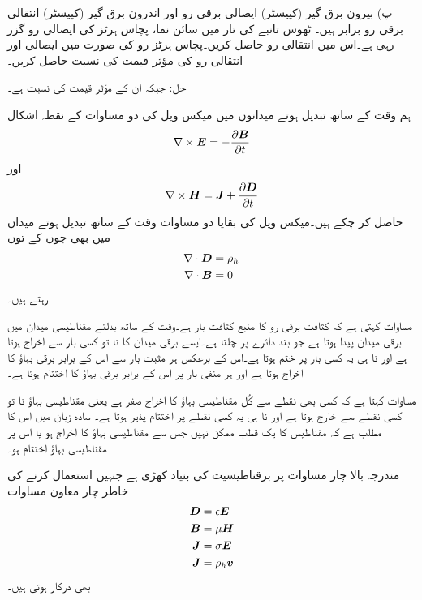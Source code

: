 پ) بیرون برق گیر (کپیسٹر)  ایصالی برقی رو اور اندرون برق گیر (کپیسٹر)  انتقالی برقی رو برابر ہیں۔
ٹھوس تانبے کی تار میں سائن نما، پچاس ہرٹز کی ایصالی رو  گزر رہی ہے۔اس میں انتقالی رو حاصل کریں۔پچاس ہرٹز رو کی صورت میں ایصالی اور انتقالی رو کی  مؤثر قیمت کی نسبت حاصل کریں۔

حل: جبکہ ان کے مؤثر قیمت کی نسبت    ہے۔


ہم وقت کے ساتھ تبدیل ہوتے میدانوں میں میکس ویل کی دو مساوات کے نقطہ اشکال
\begin{align}\label{مساوات-میکس_ویل_تفرقی_الف}
\nabla \times {\ensuremath{{\boldsymbol{E}}}}=-\frac{\partial {\ensuremath{{\boldsymbol{B}}}}}{\partial t}
\end{align}
اور
\begin{align}\label{مساوات-میکس_ویل_تفرقی_ب}
\nabla \times {\ensuremath{{\boldsymbol{H}}}}={{\boldsymbol{J}}}+\frac{\partial {\ensuremath{{\boldsymbol{D}}}}}{\partial t}
\end{align}
 حاصل کر چکے ہیں۔میکس ویل کی بقایا دو مساوات وقت کے ساتھ تبدیل ہوتے میدان میں بھی جوں کے توں
\begin{align}
\nabla \cdot {\ensuremath{{\boldsymbol{D}}}}&=\rho_h \label{مساوات_میکس_ویل_گاوس_قانون_نقطہ}\\
\nabla \cdot {\ensuremath{{\boldsymbol{B}}}}&=0 \label{مساوات_میکس_ویل_مقناطیسی_میدان_دو_قطب}
\end{align}
 رہتے ہیں۔ 

مساوات  کہتی ہے کہ کثافت برقی رو کا منبع کثافت بار  ہے۔وقت کے ساتھ بدلتے مقناطیسی میدان میں برقی میدان  پیدا ہوتا ہے جو بند دائرے پر چلتا ہے۔ایسے برقی میدان کا نا تو کسی بار سے اخراج ہوتا ہے اور نا ہی یہ کسی بار پر ختم ہوتا ہے۔اس کے برعکس ہر مثبت بار سے اس کے برابر برقی بہاؤ کا اخراج ہوتا ہے اور ہر منفی بار پر اس کے برابر برقی بہاؤ کا اختتام ہوتا ہے۔
  

مساوات  کہتا ہے کہ کسی بھی نقطے سے کُل مقناطیسی بہاؤ کا اخراج صفر ہے یعنی مقناطیسی بہاؤ نا تو کسی نقطے سے خارج ہوتا ہے اور نا ہی یہ کسی نقطے پر اختتام پذیر ہوتا ہے۔ سادہ زبان میں اس کا مطلب ہے کہ مقناطیس کا یک قطب ممکن نہیں جس سے مقناطیسی بہاؤ کا اخراج ہو یا اس پر مقناطیسی بہاؤ اختتام ہو۔

مندرجہ بالا چار مساوات پر برقناطیسیت کی بنیاد کھڑی ہے جنہیں استعمال کرنے کی خاطر چار معاون مساوات
\begin{align}
{\ensuremath{{\boldsymbol{D}}}}&=\epsilon {\ensuremath{{\boldsymbol{E}}}} \label{مساوات_میکس_ویل_خالی_خلاء_برقی_مستقل}\\
{{\boldsymbol{B}}}&=\mu {\ensuremath{{\boldsymbol{H}}}} \label{مساوات_میکس_ویل_خالی_خلاء_مقناطیسی_مستقل}\\
{{\boldsymbol{J}}}&=\sigma {\ensuremath{{\boldsymbol{E}}}}\\
{{\boldsymbol{J}}}&=\rho_h {{\boldsymbol{v}}}
\end{align}
بھی درکار ہوتی ہیں۔

